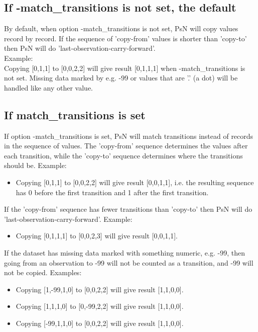 \subsection{If -match\_transitions is not set, the default}

By default, when option -match\_transitions is not set, PsN will copy values record by record. If the sequence of 'copy-from' values is shorter than 'copy-to' then PsN will do 'last-observation-carry-forward'. \\
Example:\\ 
Copying [0,1,1] to [0,0,2,2] will give result [0,1,1,1] when -match\_transitions is not set. Missing data marked by e.g. -99 or values that are '.' (a dot) will be handled like any other value. 

\subsection{If match\_transitions is set}

If option -match\_transitions is set, PsN will match transitions instead of records in the sequence of values. The 'copy-from' sequence determines the values after each transition, while the 'copy-to' sequence determines where the transitions should be. Example: 
\begin{itemize}
\item Copying [0,1,1] to [0,0,2,2] will give result [0,0,1,1], i.e. the resulting sequence has 0 before the first transition and 1 after the first transition. 
\end{itemize}

\noindent If the 'copy-from' sequence has fewer transitions than 'copy-to' then PsN will do 'last-observation-carry-forward'. Example:
\begin{itemize}
\item Copying [0,1,1,1] to [0,0,2,3] will give result [0,0,1,1]. 
\end{itemize}
\noindent If the dataset has missing data marked with something numeric, e.g. -99, then going from an observation to -99 will not be counted as a transition, and -99 will not be copied. Examples:
\begin{itemize}
\item Copying [1,-99,1,0] to [0,0,2,2] will give result [1,1,0,0]. 
\item Copying [1,1,1,0] to [0,-99,2,2] will give result [1,1,0,0].
\item Copying [-99,1,1,0] to [0,0,2,2] will give result [1,1,0,0]. 
\end{itemize}

